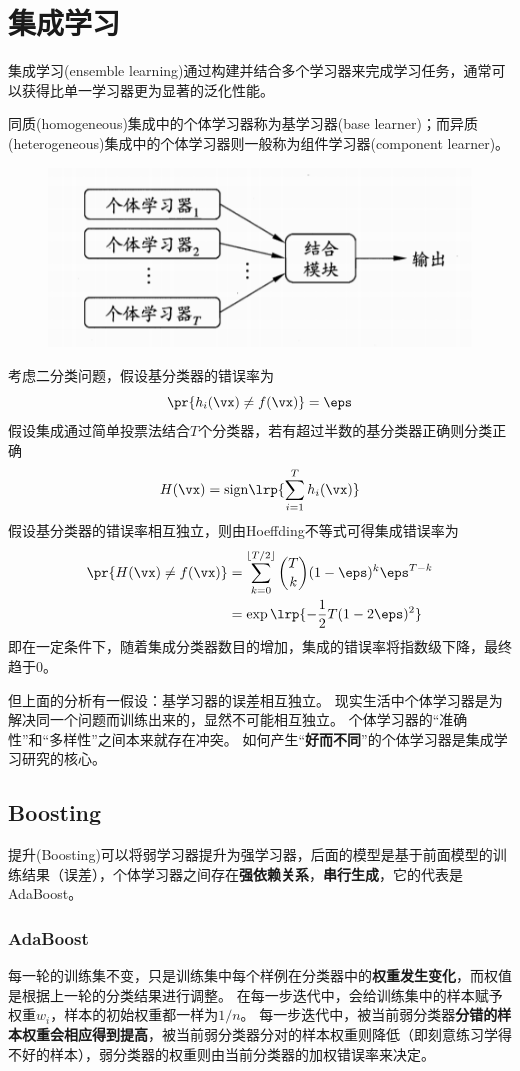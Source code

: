 
\section{集成学习}
集成学习(ensemble learning)通过构建并结合多个学习器来完成学习任务，通常可以获得比单一学习器更为显著的泛化性能。

同质(homogeneous)集成中的个体学习器称为基学习器(base learner)；而异质(heterogeneous)集成中的个体学习器则一般称为组件学习器(component learner)。
\begin{figure}[H]
\centering
\includegraphics[width=0.5\linewidth]{fig/ensemble-learning.png}
\end{figure}

考虑二分类问题，假设基分类器的错误率为
\[\pr{h_i(\vx)\ne f(\vx)}=\eps\]
假设集成通过简单投票法结合$T$个分类器，若有超过半数的基分类器正确则分类正确
\[H(\vx)=\mathrm{sign}\lrp{\sum_{i=1}^Th_i(\vx)}\]
假设基分类器的错误率相互独立，则由Hoeffding不等式可得集成错误率为
\[\begin{aligned}
\pr{H(\vx)\ne f(\vx)}
&=\sum_{k=0}^{\lfloor T/2\rfloor}\binom{T}{k}(1-\eps)^k\eps^{T-k}\\
&=\exp\lrp{-\frac{1}{2}T(1-2\eps)^2}
\end{aligned}\]
即在一定条件下，随着集成分类器数目的增加，集成的错误率将指数级下降，最终趋于$0$。

但上面的分析有一假设：基学习器的误差相互独立。
现实生活中个体学习器是为解决同一个问题而训练出来的，显然不可能相互独立。
个体学习器的“准确性”和“多样性”之间本来就存在冲突。
如何产生“\textbf{好而不同}”的个体学习器是集成学习研究的核心。

\subsection{Boosting}
提升(Boosting)可以将弱学习器提升为强学习器，后面的模型是基于前面模型的训练结果（误差），个体学习器之间存在\textbf{强依赖关系}，\textbf{串行生成}，它的代表是AdaBoost。

\subsubsection{AdaBoost}
每一轮的训练集不变，只是训练集中每个样例在分类器中的\textbf{权重发生变化}，而权值是根据上一轮的分类结果进行调整。
在每一步迭代中，会给训练集中的样本赋予权重$w_i$，样本的初始权重都一样为$1/n$。
每一步迭代中，被当前弱分类器\textbf{分错的样本权重会相应得到提高}，被当前弱分类器分对的样本权重则降低（即刻意练习学得不好的样本），弱分类器的权重则由当前分类器的加权错误率来决定。

